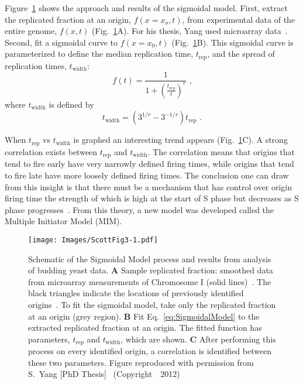 	Figure~\ref{fig:SigmoidalModel} shows the approach and results of the sigmoidal model.
	First, extract the replicated fraction at an origin, $f(x=x_o,t)$, from experimental data of the entire genome, $f(x,t)$ (Fig.~\ref{fig:SigmoidalModel}A).
	For his thesis, Yang used microarray data~\cite{McCuneMicroArray}.
	Second, fit a sigmoidal curve to $f(x=x_0,t)$ (Fig.~\ref{fig:SigmoidalModel}B).
	This sigmoidal curve is parameterized to define the median replication time, $t_{\text{rep}}$, and the spread of replication times, $t_{\text{width}}$:
	\begin{equation} \label{eq:SigmoidalModel}
		f(t) = {\frac{1}{1+\left({\frac{t_{\text{rep}}}{t}}\right)^r}}\text{ ,}
	\end{equation}
	where $t_{\text{width}}$ is defined by
	\begin{equation}
		t_{\text{width}} = \left(3^{1/r}-3^{-1/r}\right)t_{\text{rep}}\text{ .}
	\end{equation}
	
	When $t_{\text{rep}}$ vs $t_{\text{width}}$ is graphed an interesting trend appears (Fig.~\ref{fig:SigmoidalModel}C).
	A strong correlation exists between $t_{\text{rep}}$ and $t_{\text{width}}$.
	The correlation means that origins that tend to fire early have very narrowly defined firing times, while origins that tend to fire late have more loosely defined firing times.
	The conclusion one can draw from this insight is that there must be a mechanism that has control over origin firing time the strength of which is high at the start of S phase but decreases as S phase progresses~\cite{ScottsThesis}.
	From this theory, a new model was developed called the Multiple Initiator Model (MIM).
	
	\begin{figure}[tbh]
		\begin{center}
			\texttt{[image: Images/ScottFig3-1.pdf]}
		\end{center}
			\caption[Sigmoidal model]{\label{fig:SigmoidalModel} Schematic of the Sigmoidal Model process and results from analysis of budding yeast data.
				\textbf{A} Sample replicated fraction: smoothed data from microarray measurements of Chromosome I (solid lines)~\cite{McCuneMicroArray}.
				The black triangles indicate the locations of previously identified origins~\cite{OriginLocations}.
				To fit the sigmoidal model, take only the replicated fraction at an origin (grey region).
				\textbf{B} Fit Eq.~\ref{eq:SigmoidalModel} to the extracted replicated fraction at an origin.
				The fitted function has parameters, $t_{\text{rep}}$ and $t_{\text{width}}$, which are shown.
				\textbf{C} After performing this process on every identified origin, a correlation is identified between these two parameters.
				Figure reproduced with permission from S.~Yang [PhD Thesis]~\cite{ScottsThesis} (Copyright~\textcopyright~2012)}
	\end{figure}
	
